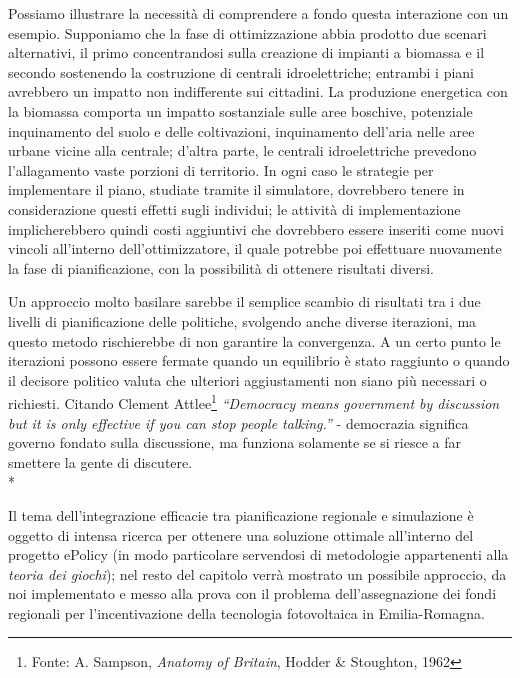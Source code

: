 Possiamo illustrare la necessità di comprendere a fondo questa interazione con un esempio. Supponiamo che la fase di ottimizzazione abbia prodotto due scenari alternativi, il primo concentrandosi sulla creazione di impianti a biomassa e il secondo sostenendo la costruzione di centrali idroelettriche; entrambi i piani avrebbero un impatto non indifferente sui cittadini. La produzione energetica con la biomassa comporta un impatto sostanziale sulle aree boschive, potenziale inquinamento del suolo e delle coltivazioni, inquinamento dell'aria nelle aree urbane vicine alla centrale; d'altra parte, le centrali idroelettriche prevedono l'allagamento vaste porzioni di territorio. In ogni caso le strategie per implementare il piano, studiate tramite il simulatore, dovrebbero tenere in considerazione questi effetti sugli individui; le attività di implementazione implicherebbero quindi costi aggiuntivi che dovrebbero essere inseriti come nuovi vincoli all'interno dell'ottimizzatore, il quale potrebbe poi effettuare nuovamente la fase di pianificazione, con la possibilità di ottenere risultati diversi. 

Un approccio molto basilare sarebbe il semplice scambio di risultati tra i due livelli di pianificazione delle politiche, svolgendo anche diverse iterazioni, ma questo metodo rischierebbe di non garantire la convergenza. A un certo punto le iterazioni possono essere fermate quando un equilibrio è stato raggiunto o quando il decisore politico valuta che ulteriori aggiustamenti non siano più necessari o richiesti. Citando Clement Attlee\footnote{Fonte: A. Sampson, \emph{Anatomy of Britain}, Hodder \& Stoughton, 1962} \emph{``Democracy means government by discussion but it is only effective if you can stop people talking.''} - democrazia significa governo fondato sulla discussione, ma funziona solamente se si riesce a far smettere la gente di discutere.
\\*

Il tema dell'integrazione efficacie tra pianificazione regionale e simulazione è oggetto di intensa ricerca per ottenere una soluzione ottimale all'interno del progetto ePolicy (in modo particolare servendosi di metodologie appartenenti alla \emph{teoria dei giochi}); nel resto del capitolo verrà mostrato un possibile approccio, da noi implementato e messo alla prova con il problema dell'assegnazione dei fondi regionali per l'incentivazione della tecnologia fotovoltaica in Emilia-Romagna.


